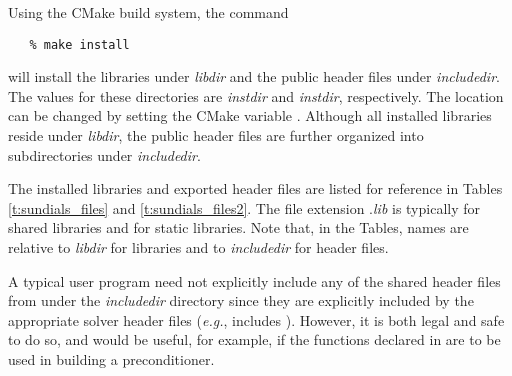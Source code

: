 Using the CMake {\sundials} build system, the command
\begin{verbatim}
   % make install
\end{verbatim}
will install the libraries under {\em libdir} and the public header
files under {\em includedir}. The values for these directories are
{\em instdir} and {\em instdir},
respectively. The location can be changed by setting the CMake variable .
Although all installed libraries reside under {\em libdir}, the public header files
are further organized into subdirectories under {\em includedir}.

The installed libraries and exported header files are listed for
reference in Tables \ref{t:sundials_files} and \ref{t:sundials_files2}.
The file extension .{\em lib}
is typically  for shared libraries and  for static libraries.
Note that, in the Tables, names are relative to {\em libdir}
for libraries and to {\em includedir} for header files.

A typical user program need not explicitly include any of the shared
{\sundials} header files from under the {\em includedir}
directory since they are explicitly included by the appropriate solver
header files ({\em e.g.},  includes
). However, it is both legal and safe to do so,
and would be useful, for example, if the functions declared in  
are to be used in building a preconditioner.

